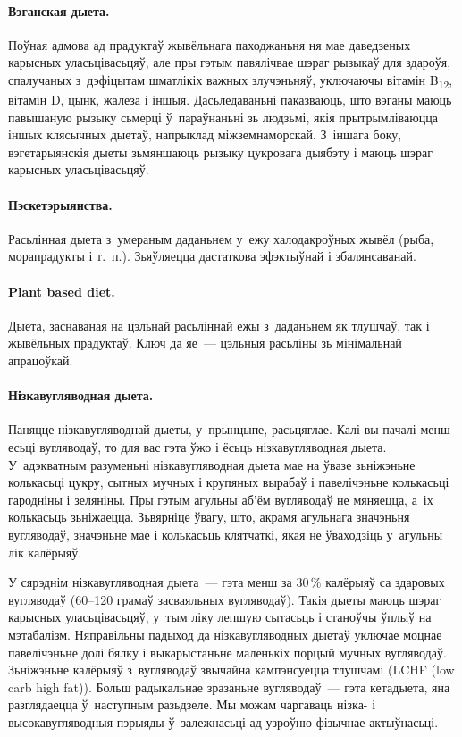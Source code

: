 \paragraph{Вэганская дыета.}
Поўная адмова ад прадуктаў жывёльнага паходжаньня ня мае даведзеных карысных уласьцівасьцяў, але пры гэтым павялічвае шэраг рызыкаў для здароўя, спалучаных з~дэфіцытам шматлікіх важных злучэньняў, уключаючы вітамін B\textsubscript{12}, вітамін D, цынк, жалеза і іншыя. Дасьледаваньні паказваюць, што вэганы маюць павышаную рызыку сьмерці ў~параўнаньні зь людзьмі, якія прытрымліваюцца іншых клясычных дыетаў, напрыклад міжземнаморскай. З~іншага боку, вэгетарыянскія дыеты зьмяншаюць рызыку цукровага дыябэту і маюць шэраг карысных уласьцівасьцяў.


\paragraph{Пэскетэрыянства.}
Расьлінная дыета з~умераным даданьнем у~ежу халодакроўных жывёл (рыба, морапрадукты і т.~п.). Зьяўляецца дастаткова эфэктыўнай і збалянсаванай.

\paragraph{Plant based diet.}
Дыета, заснаваная на цэльнай расьліннай ежы з~даданьнем як тлушчаў, так і жывёльных прадуктаў. Ключ да яе~--- цэльныя расьліны зь мінімальнай апрацоўкай.

\paragraph{Нізкавугляводная дыета.}
Паняцце нізкавугляводнай дыеты, у~прынцыпе, расьцяглае. Калі вы пачалі менш есьці вугляводаў, то для вас гэта ўжо і ёсьць нізкавугляводная дыета. У~адэкватным разуменьні нізкавугляводная дыета мае на ўвазе зьніжэньне колькасьці цукру, сытных мучных і крупяных вырабаў і павелічэньне колькасьці гародніны і зеляніны. Пры гэтым агульны аб'ём вугляводаў не мяняецца, а~іх колькасьць зьніжаецца. Зьвярніце ўвагу, што, акрамя агульнага значэньня вугляводаў, значэньне мае і колькасьць клятчаткі, якая не ўваходзіць у~агульны лік калёрыяў.

У сярэднім нізкавугляводная дыета~--- гэта менш за 30\,\% калёрыяў са здаровых вугляводаў (60--120 грамаў засваяльных вугляводаў). Такія дыеты маюць шэраг карысных уласьцівасьцяў, у~тым ліку лепшую сытасьць і станоўчы ўплыў на мэтабалізм. Няправільны падыход да нізкавугляводных дыетаў уключае моцнае павелічэньне долі бялку і выкарыстаньне маленькіх порцый мучных вугляводаў. Зьніжэньне калёрыяў з~вугляводаў звычайна кампэнсуецца тлушчамі (LCHF (low carb high fat)). Больш радыкальнае зразаньне вугляводаў~--- гэта кетадыета, яна разглядаецца ў~наступным разьдзеле. Мы можам чаргаваць нізка- і высокавугляводныя пэрыяды ў~залежнасьці ад узроўню фізычнае актыўнасьці.

